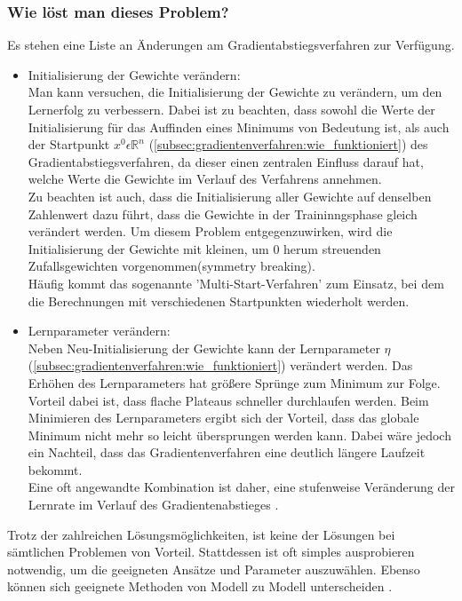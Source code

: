 \subsubsection{Wie löst man dieses Problem?}\label{subsec:gradientenverfahren:fehlerquellen_problem_loesen}
Es stehen eine Liste an Änderungen am Gradientabstiegsverfahren zur Verfügung.
\begin{itemize}
  \item Initialisierung der Gewichte verändern:\\
  Man kann versuchen, die Initialisierung der Gewichte zu verändern, um den Lernerfolg zu verbessern. Dabei ist zu beachten, dass sowohl die Werte der Initialisierung für das Auffinden eines Minimums von Bedeutung ist, 
  als auch der Startpunkt $x^0\epsilon\mathbb{R}^n$ (\ref*{subsec:gradientenverfahren:wie_funktioniert}) des Gradientabstiegsverfahren, da dieser einen zentralen Einfluss darauf hat, welche Werte die Gewichte im Verlauf des Verfahrens annehmen. \\

  Zu beachten ist auch, dass die Initialisierung aller Gewichte auf denselben Zahlenwert dazu führt, dass die Gewichte in der Traininngsphase gleich verändert werden. Um diesem Problem entgegenzuwirken, wird die Initialisierung
  der Gewichte mit kleinen, um 0 herum streuenden Zufallsgewichten vorgenommen(symmetry breaking). \\
  Häufig kommt das sogenannte 'Multi-Start-Verfahren' zum Einsatz, bei dem die Berechnungen mit verschiedenen Startpunkten wiederholt werden. 
\end{itemize}
\begin{itemize}
  \item Lernparameter verändern:\\
  Neben Neu-Initialisierung der Gewichte kann der Lernparameter $\eta$ (\ref*{subsec:gradientenverfahren:wie_funktioniert}) verändert werden. Das Erhöhen des Lernparameters hat größere Sprünge zum Minimum zur Folge. Vorteil dabei ist, dass flache Plateaus schneller durchlaufen
  werden. Beim Minimieren des Lernparameters ergibt sich der Vorteil, dass das globale Minimum nicht mehr so leicht übersprungen werden kann. Dabei wäre jedoch ein Nachteil, dass das Gradientenverfahren eine deutlich längere Laufzeit bekommt.\\
  Eine oft angewandte Kombination ist daher, eine stufenweise Veränderung der Lernrate im Verlauf des Gradientenabstieges \cite[Seite 46]{GR10}.
\end{itemize}
\noindent
Trotz der zahlreichen Lösungsmöglichkeiten, ist keine der Lösungen bei sämtlichen Problemen von Vorteil. 
Stattdessen ist oft simples ausprobieren notwendig, um die geeigneten Ansätze und Parameter auszuwählen. 
Ebenso können sich geeignete Methoden von Modell zu Modell unterscheiden \cite[Seite 48]{GR10}.

